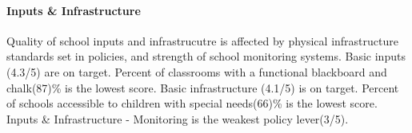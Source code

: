 \documentclass[
  twocolumn]{article}
\begin{document}
\hypertarget{inputs-infrastructure}{%
\paragraph{\texorpdfstring{\textbf{Inputs \&
Infrastructure}}{Inputs \& Infrastructure}}\label{inputs-infrastructure}}

Quality of school inputs and infrastrucutre is affected by physical
infrastructure standards set in policies, and strength of school
monitoring systems. Basic inputs (4.3/5) are on target. Percent of
classrooms with a functional blackboard and chalk(87)\% is the lowest
score. Basic infrastructure (4.1/5) is on target. Percent of schools
accessible to children with special needs(66)\% is the lowest score.
Inputs \& Infrastructure - Monitoring is the weakest policy lever(3/5).
\end{document}

